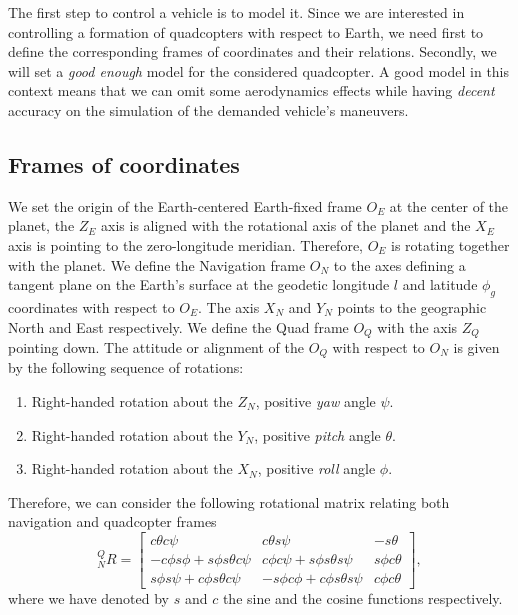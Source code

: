 \documentclass[a4paper, onecolumn]{ieeeconf}
\begin{document}
The first step to control a vehicle is to model it. Since we are interested in controlling a formation of quadcopters with respect to Earth, we need first to define the corresponding frames of coordinates and their relations. Secondly, we will set a \emph{good enough} model for the considered quadcopter. A good model in this context means that we can omit some aerodynamics effects while having \emph{decent} accuracy on the simulation of the demanded vehicle's maneuvers.

\subsection{Frames of coordinates}
We set the origin of the Earth-centered Earth-fixed frame $O_E$ at the center of the planet, the $Z_E$ axis is aligned with the rotational axis of the planet and the $X_E$ axis is pointing to the zero-longitude meridian. Therefore, $O_E$ is rotating together with the planet. We define the Navigation frame $O_N$ to the axes defining a tangent plane on the Earth's surface at the geodetic longitude $l$ and latitude $\phi_g$ coordinates with respect to $O_E$. The axis $X_N$ and $Y_N$ points to the geographic North and East respectively. We define the Quad frame $O_Q$ with the axis $Z_Q$ pointing down. The attitude or alignment of the $O_Q$ with respect to $O_N$ is given by the following sequence of rotations:
\begin{enumerate}
\item Right-handed rotation about the $Z_N$, positive \emph{yaw} angle $\psi$.
\item Right-handed rotation about the $Y_N$, positive \emph{pitch} angle $\theta$.
\item Right-handed rotation about the $X_N$, positive \emph{roll} angle $\phi$.
\end{enumerate}
Therefore, we can consider the following rotational matrix relating both navigation and quadcopter frames
\begin{equation}
_N^QR = \begin{bmatrix}c\theta c\psi & c\theta s\psi & -s\theta \\ -c\phi s\phi + s\phi s\theta c\psi & c\phi c\psi + s\phi s\theta s\psi & s\phi c\theta \\ s\phi s\psi + c\phi s\theta c\psi & -s\phi c\phi + c\phi s\theta s\psi & c\phi c\theta\end{bmatrix},
	\label{eq: NQR}
\end{equation}
where we have denoted by $s$ and $c$ the sine and the cosine functions respectively.
\end{document}
